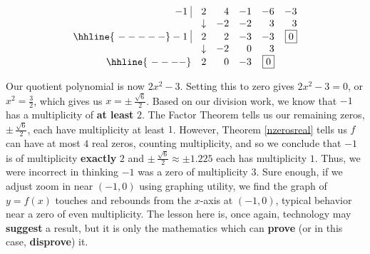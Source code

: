 \documentclass{ximera}
\begin{document}
\begin{example}
\begin{enumerate}
\[\begin{array}{rrrrrr}
 -1 \, \, \vline& 2 & 4 & -1  & -6 & -3 \\

  & \downarrow     &  -2  &  -2  & 3 & 3\\ \hhline{~-----} 
  
  -1 \, \, \vline&  2 &   2  & -3 & -3 &  \fbox{$0$}  \\
    
               & \downarrow &  -2  &  0  & 3 &\\ \hhline{~----} 
 
   & 2  &   0  & -3& \fbox{0} &   \\
  
        

\end{array}\]

 Our quotient polynomial is now $2x^2 - 3$.  Setting this to zero gives $2x^2 - 3 = 0$, or $x^2 = \frac{3}{2}$, which gives us $x = \pm \, \frac{\sqrt{6}}{2}$.  Based on our division work, we know that $-1$ has a multiplicity of \textbf{at least} $2$. The Factor Theorem tells us our remaining zeros, $\pm \, \frac{\sqrt{6}}{2}$, each have multiplicity at least $1$.  However, Theorem \ref{nzerosreal} tells us $f$ can have at most $4$ real zeros, counting multiplicity, and so we conclude that $-1$ is of multiplicity \textbf{exactly} $2$ and $\pm \, \frac{\sqrt{6}}{2} \approx \pm 1.225$ each has multiplicity $1$. Thus, we were incorrect in thinking  $-1$ was a zero of multiplicity $3$.  Sure enough, if we adjust zoom in near $(-1,0)$ using graphing utility, we find the graph of $y = f(x)$ touches and rebounds from the $x$-axis at $(-1,0)$, typical behavior near a zero of even multiplicity. The lesson here is, once again, technology may \textbf{suggest} a result, but it is only the mathematics which can \textbf{prove} (or in this case, \textbf{disprove}) it.  

\end{enumerate}

\begin{center}

\begin{tabular}{cc}


\end{tabular}
\end{center}
\end{example}
\end{document}
